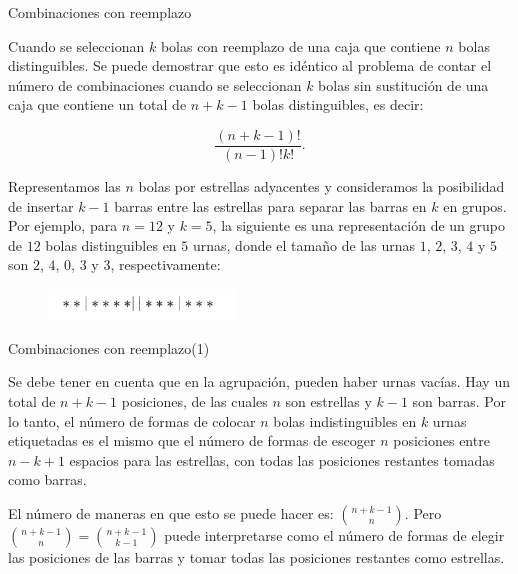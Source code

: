 \documentclass[10pt]{beamer}
\begin{document}
\begin{frame}{Combinaciones con reemplazo }
	
\small{Cuando se seleccionan $k$ bolas con reemplazo de una caja que contiene $n$ bolas distinguibles. Se puede demostrar que esto es id\'entico al problema de contar el n\'umero de combinaciones cuando se seleccionan $k$ bolas sin sustituci\'on de una caja que contiene un total de $n + k- 1$ bolas distinguibles, es decir:
	
	\[
	\frac{(n + k -1)!}{(n -1)!k!}.
	\]

\vspace{0.2cm}

Representamos las $n$ bolas por estrellas adyacentes y consideramos la posibilidad de insertar $k -1$ barras entre las estrellas para separar las barras en $k$ en grupos. Por ejemplo, para $n =12$ y $k =5$, la siguiente es una representaci\'on de un grupo  de $12$ bolas distinguibles en $5$ urnas, donde el tama\~no de las urnas $1$, $2$, $3$, $4$ y $5$ son $2$, $4$, $0$, $3$ y $3$, respectivamente:

\vspace{0.2cm}

\begin{figure}[h]
	\centering
	\includegraphics[width=5cm]{c2}
\end{figure}
	}
\end{frame}

\begin{frame}{Combinaciones con reemplazo(1)}
	
Se debe tener  en cuenta que en la agrupaci\'on,  pueden haber urnas vac\'ias. Hay un total de $n + k -1$ posiciones, de las cuales $n$ son estrellas y $k -1$ son barras. Por lo tanto, el n\'umero de formas de colocar $n$ bolas indistinguibles en $k$ urnas etiquetadas es el mismo que el n\'umero de formas de escoger $n$ posiciones entre $n -k + 1$ espacios para las estrellas, con todas las posiciones restantes tomadas como barras.

\vspace{0.5cm}

El n\'umero de maneras en que esto se puede hacer es: $\binom{n + k -1}{n}$. Pero	 $\binom{n + k -1}{n} =  \binom{n + k -1}{k -1}$ puede interpretarse como el n\'umero de formas de elegir las posiciones de las barras y tomar todas las posiciones restantes como estrellas.
\end{frame}
\end{document}
